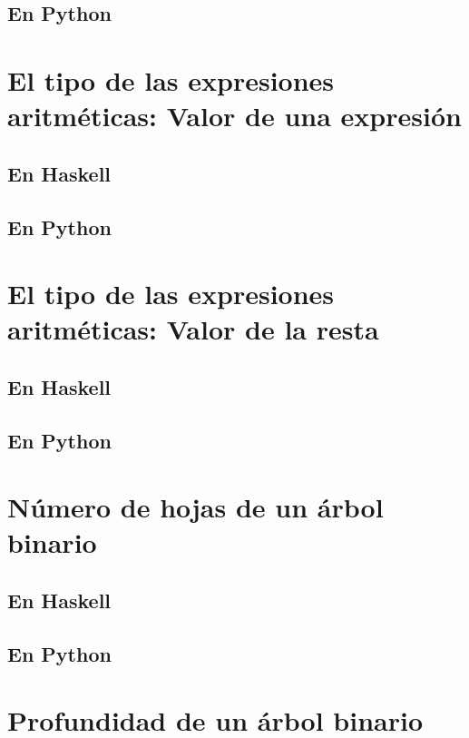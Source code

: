 \documentclass[a4paper,12pt,twoside]{book}
\begin{document}
\subsection*{En Python}

\section{El tipo de las expresiones aritméticas: Valor de una expresión}
\subsection*{En Haskell}
\subsection*{En Python}

\section{El tipo de las expresiones aritméticas: Valor de la resta}
\subsection*{En Haskell}
\subsection*{En Python}

\section{Número de hojas de un árbol binario}
\subsection*{En Haskell}
\subsection*{En Python}

\section{Profundidad de un árbol binario}
\end{document}
